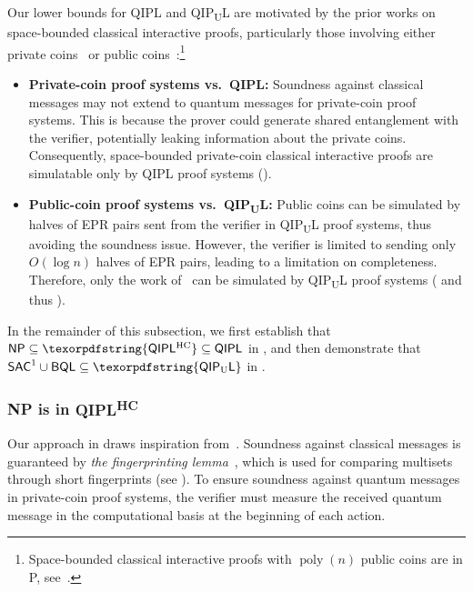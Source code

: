 \documentclass[11pt, a4paper]{article}
\numberwithin{equation}{section}
\numberwithin{figure}{section}
\newcommand{\Ptime}{\textnormal{\textsf{P}}\xspace}
\newcommand{\NP}{\textnormal{\textsf{NP}}\xspace}
\newcommand{\QIPL}{\textnormal{\textsf{QIPL}}\xspace}
\newcommand{\QIPUL}{\texorpdfstring{\textnormal{\textsf{QIP}\textsubscript{\textnormal{U}}\textsf{L}}}\xspace}
\newcommand{\QIPLHC}{\texorpdfstring{\textnormal{\textsf{QIPL}\textsuperscript{\textnormal{HC}}}}\xspace}
\newcommand{\BQL}{\textnormal{\textsf{BQL}}\xspace}
\newcommand{\SAC}{\textnormal{\textsf{SAC}}\xspace}
\DeclareMathOperator\poly{poly}
\begin{document}
Our lower bounds for \QIPL{} and \QIPUL{} are motivated by the prior works on space-bounded classical interactive proofs, particularly those involving either private coins~\cite{CL95} or public coins~\cite{Fortnow89,FL93,Condon92survey, GKR15, CR23}:\footnote{Space-bounded classical interactive proofs with $\poly(n)$ public coins are in \Ptime{}, see~\cite[Theorem 6]{Condon92survey}.}
\begin{itemize}[itemsep=0.33em,topsep=0.33em,parsep=0.33em]
    \item \textbf{Private-coin proof systems vs.~\QIPL{}:} Soundness against classical messages may not extend to quantum messages for private-coin proof systems. This is because the prover could generate shared entanglement with the verifier, potentially leaking information about the private coins. Consequently, space-bounded private-coin classical interactive proofs are simulatable only by \QIPL{} proof systems (). 
    \item \textbf{Public-coin proof systems vs.~\QIPUL{}:} Public coins can be simulated by halves of EPR pairs sent from the verifier in \QIPUL{} proof systems, thus avoiding the soundness issue. However, the verifier is limited to sending only $O(\log{n})$ halves of EPR pairs, leading to a limitation on completeness. Therefore, only the work of~\cite{Fortnow89} can be simulated by \QIPUL{} proof systems ( and thus ). 
\end{itemize}

In the remainder of this subsection, we first establish that $\NP \subseteq \QIPLHC \subseteq \QIPL$ in , and then demonstrate that $\SAC^1 \cup \BQL \subseteq \QIPUL$ in . 

\subsubsection{\NP{} is in \QIPLHC{}}
\label{subsubsec:NP-in-QIPL}

Our approach in  draws inspiration from~\cite[Lemma 2]{CL95}.
Soundness against classical messages is guaranteed by \textit{the fingerprinting lemma}~\cite{Lipton90}, which is used for comparing multisets through short fingerprints (see ). 
To ensure soundness against quantum messages in private-coin proof systems, the verifier must measure the received quantum message in the computational basis at the beginning of each action. 
\end{document}

